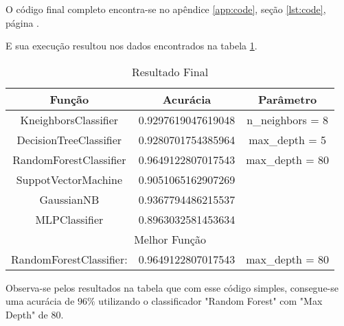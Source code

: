 O código final completo encontra-se no apêndice \ref{app:code}, seção
\ref{lst:code}, página \pageref{lst:code}.

E sua execução resultou nos dados encontrados na tabela \ref{tab:resultado}.

\setlength{\arrayrulewidth}{0.6mm}
\begin{table}[h!]
\centering
\begin{tabular}{ |c|c|c| }
 \hline
 Função                   & Acurácia           & Parâmetro  \\
 \hline
 KneighborsClassifier     & 0.9297619047619048 & n\_neighbors = 8  \\
 DecisionTreeClassifier   & 0.9280701754385964 & max\_depth = 5    \\
 RandomForestClassifier   & 0.9649122807017543 & max\_depth = 80   \\
 SuppotVectorMachine      & 0.9051065162907269 &                   \\
 GaussianNB               & 0.9367794486215537 &                   \\
 MLPClassifier            & 0.8963032581453634 &                   \\
 \hline
 \hline
 \multicolumn{3}{|c|}{ Melhor Função} \\
 \hline
 RandomForestClassifier:  & 0.9649122807017543 & max\_depth = 80   \\
 \hline
\end{tabular}
  \caption{Resultado Final}
\label{tab:resultado}
\end{table}

Observa-se pelos resultados na tabela que com esse código simples, consegue-se uma acurácia de $96\%$
utilizando o classificador "Random Forest" com "Max Depth" de $80$.









